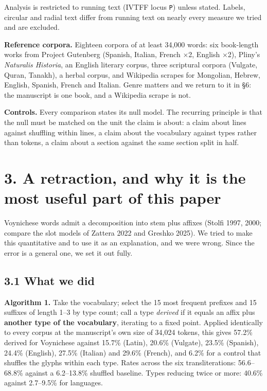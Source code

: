 \documentclass[11pt,a4paper]{article}
\begin{document}
Analysis is restricted to running text (IVTFF locus \texttt{P}) unless stated. Labels, circular and radial text differ from running text on nearly every measure we tried and are excluded.


\textbf{Reference corpora.} Eighteen corpora of at least 34,000 words: six book-length works from Project Gutenberg (Spanish, Italian, French $\times$2, English $\times$2), Pliny's \emph{Naturalis Historia}, an English literary corpus, three scriptural corpora (Vulgate, Quran, Tanakh), a herbal corpus, and Wikipedia scrapes for Mongolian, Hebrew, English, Spanish, French and Italian. Genre matters and we return to it in \S6: the manuscript is one book, and a Wikipedia scrape is not.


\textbf{Controls.} Every comparison states its null model. The recurring principle is that the null must be matched on the unit the claim is about: a claim about lines against shuffling within lines, a claim about the vocabulary against types rather than tokens, a claim about a section against the same section split in half.

\section*{3. A retraction, and why it is the most useful part of this paper}


Voynichese words admit a decomposition into stem plus affixes (Stolfi 1997, 2000; compare the slot models of Zattera 2022 and Greshko 2025). We tried to make this quantitative and to use it as an explanation, and we were wrong. Since the error is a general one, we set it out fully.


\subsection*{3.1 What we did}


\textbf{Algorithm 1.} Take the vocabulary; select the 15 most frequent prefixes and 15 suffixes of length 1--3 by type count; call a type \emph{derived} if it equals an affix plus \textbf{another type of the vocabulary}, iterating to a fixed point. Applied identically to every corpus at the manuscript's own size of 34,024 tokens, this gives 57.2\% derived for Voynichese against 15.7\% (Latin), 20.6\% (Vulgate), 23.5\% (Spanish), 24.4\% (English), 27.5\% (Italian) and 29.6\% (French), and 6.2\% for a control that shuffles the glyphs within each type. Rates across the six transliterations: 56.6--68.8\% against a 6.2--13.8\% shuffled baseline. Types reducing twice or more: 40.6\% against 2.7--9.5\% for languages.
\end{document}
